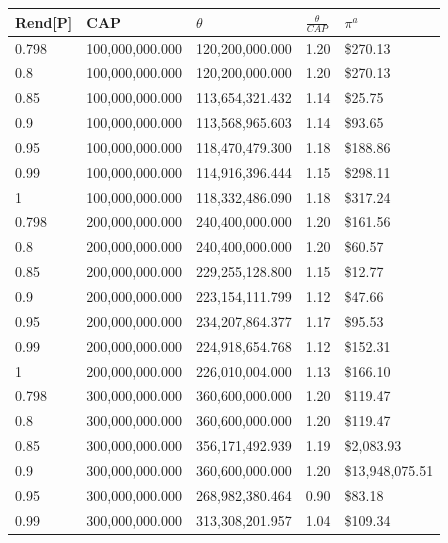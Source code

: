 \begin{table}[H]
    \centering
    \begin{tabular}{|l|l|l|l|l|}
    \hline
        Rend[P]  & CAP & $\theta$  & $\frac{\theta}{CAP}$  & $\pi^a$ \\ \hline
        0.798 & 100,000,000.000 & 120,200,000.000 & 1.20 &  \$270.13  \\ \hline
        0.8 & 100,000,000.000 & 120,200,000.000 & 1.20 &  \$270.13  \\ \hline
        0.85 & 100,000,000.000 & 113,654,321.432 & 1.14 &  \$25.75  \\ \hline
        0.9 & 100,000,000.000 & 113,568,965.603 & 1.14 &  \$93.65  \\ \hline
        0.95 & 100,000,000.000 & 118,470,479.300 & 1.18 &  \$188.86  \\ \hline
        0.99 & 100,000,000.000 & 114,916,396.444 & 1.15 &  \$298.11  \\ \hline
        1 & 100,000,000.000 & 118,332,486.090 & 1.18 &  \$317.24  \\ \hline
        0.798 & 200,000,000.000 & 240,400,000.000 & 1.20 &  \$161.56  \\ \hline
        0.8 & 200,000,000.000 & 240,400,000.000 & 1.20 &  \$60.57  \\ \hline
        0.85 & 200,000,000.000 & 229,255,128.800 & 1.15 &  \$12.77  \\ \hline
        0.9 & 200,000,000.000 & 223,154,111.799 & 1.12 &  \$47.66  \\ \hline
        0.95 & 200,000,000.000 & 234,207,864.377 & 1.17 &  \$95.53  \\ \hline
        0.99 & 200,000,000.000 & 224,918,654.768 & 1.12 &  \$152.31  \\ \hline
        1 & 200,000,000.000 & 226,010,004.000 & 1.13 &  \$166.10  \\ \hline
        0.798 & 300,000,000.000 & 360,600,000.000 & 1.20 &  \$119.47  \\ \hline
        0.8 & 300,000,000.000 & 360,600,000.000 & 1.20 &  \$119.47  \\ \hline
        0.85 & 300,000,000.000 & 356,171,492.939 & 1.19 &  \$2,083.93  \\ \hline
        0.9 & 300,000,000.000 & 360,600,000.000 & 1.20 &  \$13,948,075.51  \\ \hline
        0.95 & 300,000,000.000 & 268,982,380.464 & 0.90 &  \$83.18  \\ \hline
        0.99 & 300,000,000.000 & 313,308,201.957 & 1.04 &  \$109.34  \\ \hline

\end{tabular}
\end{table}
